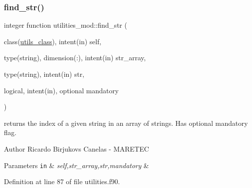 \mbox{\label{namespaceutilities__mod_ad446cce78a6509db0e839439a0e84564}} 
\subsubsection{\texorpdfstring{find\+\_\+str()}{find\_str()}}
{\footnotesize\ttfamily integer function utilities\+\_\+mod\+::find\+\_\+str (\begin{DoxyParamCaption}\item[{class(\mbox{\hyperlink{structutilities__mod_1_1utils__class}{utils\+\_\+class}}), intent(in)}]{self,  }\item[{type(string), dimension(\+:), intent(in)}]{str\+\_\+array,  }\item[{type(string), intent(in)}]{str,  }\item[{logical, intent(in), optional}]{mandatory }\end{DoxyParamCaption})\hspace{0.3cm}{\ttfamily [private]}}



returns the index of a given string in an array of strings. Has optional mandatory flag. 

\begin{DoxyAuthor}{Author}
Ricardo Birjukovs Canelas -\/ M\+A\+R\+E\+T\+EC 
\end{DoxyAuthor}

\begin{DoxyParams}[1]{Parameters}
\mbox{\tt in}  & {\em self,str\+\_\+array,str,mandatory} & \\
\hline
\end{DoxyParams}


Definition at line 87 of file utilities.\+f90.


